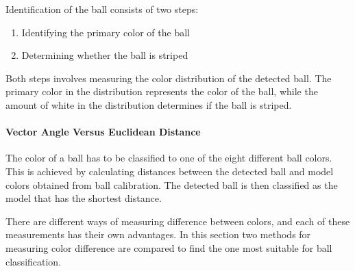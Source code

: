 Identification of the ball consists of two steps:
\begin{enumerate}
  \item Identifying the primary color of the ball
  \item Determining whether the ball is striped
\end{enumerate}
Both steps involves measuring the color distribution of the detected ball. The primary color in the distribution represents the color of the ball, while the amount of white in the distribution determines if the ball is striped.

\paragraph{Vector Angle Versus Euclidean Distance}
The color of a ball has to be classified to one of the eight different ball colors. This is achieved by calculating distances between the detected ball and model colors obtained from ball calibration. The detected ball is then classified as the model that has the shortest distance.

There are different ways of measuring difference between colors, and each of these measurements has their own advantages. In this section two methods for measuring color difference are compared to find the one most suitable for ball classification.

